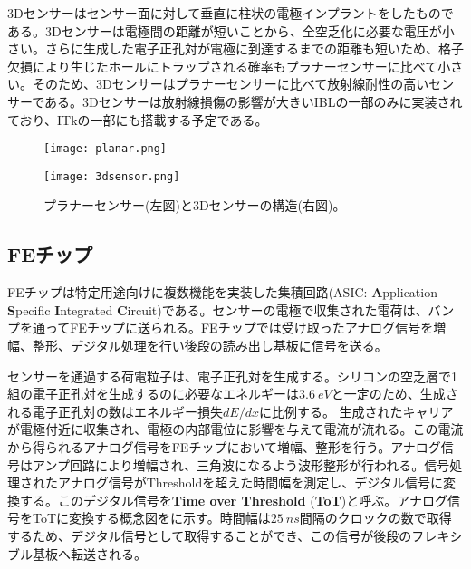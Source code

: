 3Dセンサーはセンサー面に対して垂直に柱状の電極インプラントをしたものである。3Dセンサーは電極間の距離が短いことから、全空乏化に必要な電圧が小さい。さらに生成した電子正孔対が電極に到達するまでの距離も短いため、格子欠損により生じたホールにトラップされる確率もプラナーセンサーに比べて小さい。そのため、3Dセンサーはプラナーセンサーに比べて放射線耐性の高いセンサーである。3Dセンサーは放射線損傷の影響が大きいIBLの一部のみに実装されており、ITkの一部にも搭載する予定である。

\begin{figure}[tbp]
  \begin{minipage}[b]{0.45\linewidth}
    \centering
    \texttt{[image: planar.png]}
  \end{minipage}
  \begin{minipage}[b]{0.45\linewidth}
    \centering
    \texttt{[image: 3dsensor.png]}
  \end{minipage}
  \caption[プラナーセンサーと3Dセンサーの構造]{プラナーセンサー(左図)と3Dセンサーの構造(右図)。}
  \label{fig:3dplanar}
\end{figure}


\subsection{FEチップ}
\label{sec:ASIC}

FEチップは特定用途向けに複数機能を実装した集積回路(ASIC: \textbf{A}pplication \textbf{S}pecific \textbf{I}ntegrated \textbf{C}ircuit)である。センサーの電極で収集された電荷は、バンプを通ってFEチップに送られる。FEチップでは受け取ったアナログ信号を増幅、整形、デジタル処理を行い後段の読み出し基板に信号を送る。

センサーを通過する荷電粒子は、電子正孔対を生成する。シリコンの空乏層で1組の電子正孔対を生成するのに必要なエネルギーは$3.6\ \si{eV}$と一定のため、生成される電子正孔対の数はエネルギー損失$dE/dx$に比例する。
生成されたキャリアが電極付近に収集され、電極の内部電位に影響を与えて電流が流れる。この電流から得られるアナログ信号をFEチップにおいて増幅、整形を行う。アナログ信号はアンプ回路により増幅され、三角波になるよう波形整形が行われる。信号処理されたアナログ信号がThresholdを超えた時間幅を測定し、デジタル信号に変換する。このデジタル信号を\textbf{Time over Threshold} (\textbf{ToT})と呼ぶ。アナログ信号をToTに変換する概念図をに示す。時間幅は$25\ \si{ns}$間隔のクロックの数で取得するため、デジタル信号として取得することができ、この信号が後段のフレキシブル基板へ転送される。

